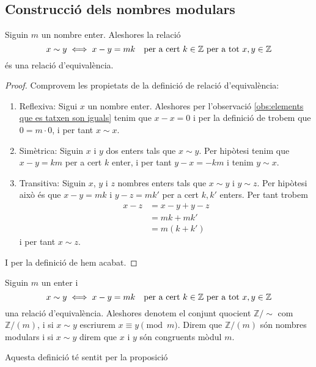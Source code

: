 \documentclass[../Apunts.tex]{subfiles}
\begin{document}
	\subsection{Construcció dels nombres modulars}
	\begin{proposition}
		\label{prop:relació d'equivalència Z/(m)}
		Siguin \(m\) un nombre enter. Aleshores la relació
		\[x\sim y\iff x-y=mk\quad\text{per a cert }k\in\mathbb{Z}\text{ per a tot }x,y\in\mathbb{Z}\]
		és una relació d'equivalència.
		\begin{proof}
			Comprovem les propietats de la definició de relació d'equivalència:
			\begin{enumerate}
				\item Reflexiva: Sigui \(x\) un nombre enter. Aleshores per l'observació \ref{obs:elements que es tatxen son iguals} tenim que \(x-x=0\) i per la definició de  trobem que \(0=m\cdot 0\), i per tant \(x\sim x\).
				\item Simètrica: Siguin \(x\) i \(y\) dos enters tals que \(x\sim y\). Per hipòtesi tenim que \(x-y=km\) per a cert \(k\) enter, i per tant \(y-x=-km\) i tenim \(y\sim x\).
				\item Transitiva: Siguin \(x\), \(y\) i \(z\) nombres enters tals que \(x\sim y\) i \(y\sim z\). Per hipòtesi això és que \(x-y=mk\) i \(y-z=mk'\) per a cert \(k,k'\) enters. Per tant trobem
				\begin{align*}
				x-z&=x-y+y-z\\
				&=mk+mk'\\
				&=m(k+k')
				\end{align*}
				i per tant \(x\sim z\).
			\end{enumerate}
			I per la definició de  hem acabat.
		\end{proof}
	\end{proposition}
	\begin{definition}
		\label{def:nombres modulars}\label{def:Z/(m)}
		\label{def:nombres modulars congruents}
		Siguin \(m\) un enter i
		\[x\sim y\iff x-y=mk\quad\text{per a cert }k\in\mathbb{Z}\text{ per a tot }x,y\in\mathbb{Z}\]
		una relació d'equivalència. Aleshores denotem el conjunt quocient \(\mathbb{Z}/\sim\) com \(\mathbb{Z}/(m)\), i si \(x\sim y\) escriurem \(x\equiv y\pmod{m}\). Direm que \(\mathbb{Z}/(m)\) són nombres modulars i si \(x\sim y\) direm que \(x\) i \(y\) són congruents mòdul \(m\).
		
		Aquesta definició té sentit per la proposició 
	\end{definition}
\end{document}
